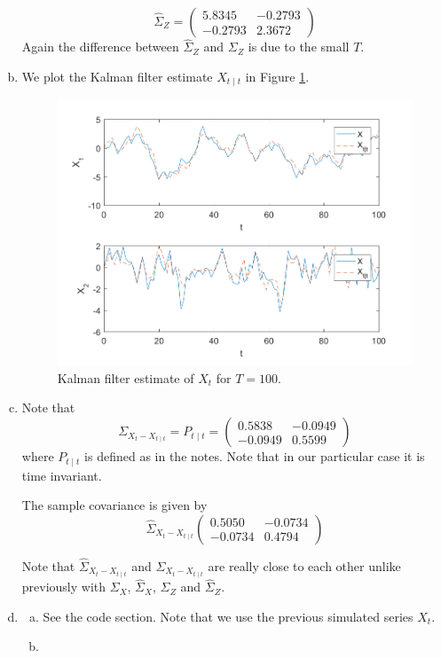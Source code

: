 \documentclass[12pt]{article}
\theoremstyle{definition}
\newcommand{\pa}[1]{\left(#1\right)}
\newcommand{\mat}[1]{\begin{matrix}#1\end{matrix}}
\newcommand{\pmat}[1]{\pa{\mat{#1}}}
\begin{document}
\begin{enumerate}[(a)]
	
	\[
	\hat{\Sigma}_Z = \pmat{5.8345   &-0.2793\\
		-0.2793  &  2.3672}
\]
Again the difference between $\hat{\Sigma}_Z $ and $\Sigma_Z$ is due to the small $T$.
	

	\item
	
	We plot the Kalman filter estimate $X_{t\mid t}$ in Figure \ref{fig:plotc}.
			\begin{figure}[H]
		\centering
		\includegraphics[width=.9\linewidth]{plot_c}
		\caption{Kalman filter estimate of $X_t$ for $T=100$.}
		\label{fig:plotc}
	\end{figure}
	\item

Note that 
	\[
	{\Sigma}_{X_t-X_{t\mid t}}  = P_{t\mid t} = 
	\pmat{0.5838 &  -0.0949\\
		-0.0949  &  0.5599}\]
	where $P_{t\mid t}$ is defined as in the notes. Note that in our particular case it is time invariant.

The sample covariance is given by
	\[
	\hat{\Sigma}_{X_t-X_{t\mid t}} 
	\pmat{ 0.5050  & -0.0734\\
		-0.0734   & 0.4794}\]
	
	Note that $\hat{\Sigma}_{X_t-X_{t\mid t}} $ and ${\Sigma}_{X_t-X_{t\mid t}}$ are really close to each other unlike previously with $\Sigma_X$, $\hat{\Sigma}_X$, $\Sigma_Z$ and $\hat{\Sigma}_Z$.
	
	\item
	\begin{enumerate}[(a)]
		\item
		
		See the code section. Note that we use the previous simulated series $X_t$.
		\item
	

\end{enumerate}
\end{enumerate}
\end{document}
